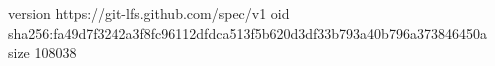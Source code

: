 version https://git-lfs.github.com/spec/v1
oid sha256:fa49d7f3242a3f8fc96112dfdca513f5b620d3df33b793a40b796a373846450a
size 108038
